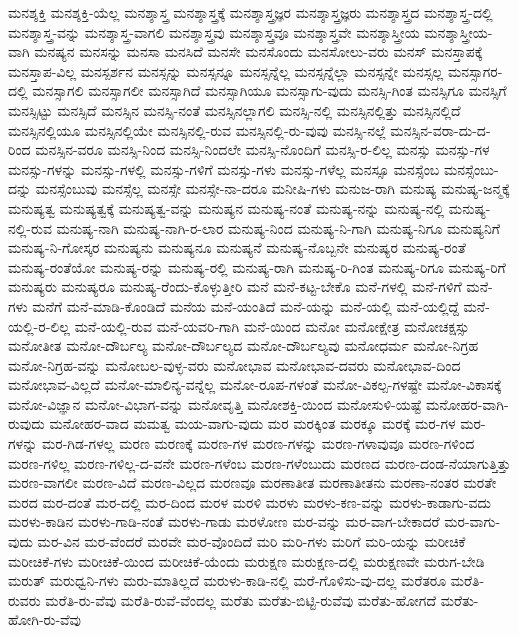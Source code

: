 {ಮನಶ್ಶಕ್ತಿ
ಮನಶ್ಶಕ್ತಿ-ಯೆಲ್ಲ
ಮನಶ್ಶಾಸ್ತ್ರ
ಮನಶ್ಶಾಸ್ತ್ರಕ್ಕೆ
ಮನಶ್ಶಾಸ್ತ್ರಜ್ಞರ
ಮನಶ್ಶಾಸ್ತ್ರಜ್ಞರು
ಮನಶ್ಶಾಸ್ತ್ರದ
ಮನಶ್ಶಾಸ್ತ್ರ-ದಲ್ಲಿ
ಮನಶ್ಶಾಸ್ತ್ರ-ವನ್ನು
ಮನಶ್ಶಾಸ್ತ್ರ-ವಾಗಲಿ
ಮನಶ್ಶಾಸ್ತ್ರವು
ಮನಶ್ಶಾಸ್ತ್ರವೂ
ಮನಶ್ಶಾಸ್ತ್ರವೇ
ಮನಶ್ಶಾಸ್ತ್ರೀಯ
ಮನಶ್ಶಾಸ್ತ್ರೀಯ-ವಾಗಿ
ಮನಷ್ಯನ
ಮನಸನ್ನು
ಮನಸಾ
ಮನಸಿದೆ
ಮನಸೇ
ಮನಸೊಂದು
ಮನಸೋಲು-ವರು
ಮನಸ್
ಮನಸ್ತಾಪಕ್ಕೆ
ಮನಸ್ತಾಪ-ವಿಲ್ಲ
ಮನಸ್ಪರ್ಶನ
ಮನಸ್ಸನ್ನು
ಮನಸ್ಸನ್ನೂ
ಮನಸ್ಸನ್ನೆಲ್ಲ
ಮನಸ್ಸನ್ನೆಲ್ಲಾ
ಮನಸ್ಸನ್ನೇ
ಮನಸ್ಸಲ್ಲ
ಮನಸ್ಸಾಗರ-ದಲ್ಲಿ
ಮನಸ್ಸಾಗಲಿ
ಮನಸ್ಸಾಗಲೀ
ಮನಸ್ಸಾಗಿದೆ
ಮನಸ್ಸಾಗಿಯೂ
ಮನಸ್ಸಾಗು-ವುದು
ಮನಸ್ಸಿ-ಗಿಂತ
ಮನಸ್ಸಿಗೂ
ಮನಸ್ಸಿಗೆ
ಮನಸ್ಸಿಟ್ಟು
ಮನಸ್ಸಿದೆ
ಮನಸ್ಸಿನ
ಮನಸ್ಸಿ-ನಂತೆ
ಮನಸ್ಸಿನಲ್ಲಾಗಲಿ
ಮನಸ್ಸಿ-ನಲ್ಲಿ
ಮನಸ್ಸಿನಲ್ಲಿತ್ತು
ಮನಸ್ಸಿನಲ್ಲಿದೆ
ಮನಸ್ಸಿನಲ್ಲಿಯೂ
ಮನಸ್ಸಿನಲ್ಲಿಯೇ
ಮನಸ್ಸಿನಲ್ಲಿ-ರುವ
ಮನಸ್ಸಿನಲ್ಲಿ-ರು-ವುವು
ಮನಸ್ಸಿ-ನಲ್ಲೆ
ಮನಸ್ಸಿನ-ವರಾ-ದು-ದ-ರಿಂದ
ಮನಸ್ಸಿನ-ವರೂ
ಮನಸ್ಸಿ-ನಿಂದ
ಮನಸ್ಸಿ-ನಿಂದಲೇ
ಮನಸ್ಸಿ-ನೊಂದಿಗೆ
ಮನಸ್ಸಿ-ರ-ಲಿಲ್ಲ
ಮನಸ್ಸು
ಮನಸ್ಸು-ಗಳ
ಮನಸ್ಸು-ಗಳನ್ನು
ಮನಸ್ಸು-ಗಳಲ್ಲಿ
ಮನಸ್ಸು-ಗಳಿಗೆ
ಮನಸ್ಸು-ಗಳು
ಮನಸ್ಸು-ಗಳೆಲ್ಲ
ಮನಸ್ಸೂ
ಮನಸ್ಸೆಂಬ
ಮನಸ್ಸೆಂಬು-ದನ್ನು
ಮನಸ್ಸೆಂಬುವು
ಮನಸ್ಸೆಲ್ಲ
ಮನಸ್ಸೇ
ಮನಸ್ಸೇ-ನಾ-ದರೂ
ಮನೀಷಿ-ಗಳು
ಮನುಜ-ರಾಗಿ
ಮನುಷ್ಯ
ಮನುಷ್ಯ-ಜನ್ಮಕ್ಕೆ
ಮನುಷ್ಯತ್ವ
ಮನುಷ್ಯತ್ವಕ್ಕೆ
ಮನುಷ್ಯತ್ವ-ವನ್ನು
ಮನುಷ್ಯನ
ಮನುಷ್ಯ-ನಂತೆ
ಮನುಷ್ಯ-ನನ್ನು
ಮನುಷ್ಯ-ನಲ್ಲಿ
ಮನುಷ್ಯ-ನಲ್ಲಿ-ರುವ
ಮನುಷ್ಯ-ನಾಗಿ
ಮನುಷ್ಯ-ನಾಗಿ-ರ-ಲಾರ
ಮನುಷ್ಯ-ನಿಂದ
ಮನುಷ್ಯ-ನಿ-ಗಾಗಿ
ಮನುಷ್ಯ-ನಿಗೂ
ಮನುಷ್ಯನಿಗೆ
ಮನುಷ್ಯ-ನಿ-ಗೋಸ್ಕರ
ಮನುಷ್ಯನು
ಮನುಷ್ಯನೂ
ಮನುಷ್ಯನೆ
ಮನುಷ್ಯ-ನೊಬ್ಬನೇ
ಮನುಷ್ಯರ
ಮನುಷ್ಯ-ರಂತೆ
ಮನುಷ್ಯ-ರಂತೆಯೋ
ಮನುಷ್ಯ-ರನ್ನು
ಮನುಷ್ಯ-ರಲ್ಲಿ
ಮನುಷ್ಯ-ರಾಗಿ
ಮನುಷ್ಯ-ರಿ-ಗಿಂತ
ಮನುಷ್ಯ-ರಿಗೂ
ಮನುಷ್ಯ-ರಿಗೆ
ಮನುಷ್ಯರು
ಮನುಷ್ಯರೂ
ಮನುಷ್ಯ-ರೆಂದು-ಕೊಳ್ಳುತ್ತೀರಿ
ಮನೆ
ಮನೆ-ಕಟ್ಟ-ಬೇಕೊ
ಮನೆ-ಗಳಲ್ಲಿ
ಮನೆ-ಗಳಿಗೆ
ಮನೆ-ಗಳು
ಮನೆಗೆ
ಮನೆ-ಮಾಡಿ-ಕೊಂಡಿದೆ
ಮನೆಯ
ಮನೆ-ಯಂತಿದೆ
ಮನೆ-ಯನ್ನು
ಮನೆ-ಯಲ್ಲಿ
ಮನೆ-ಯಲ್ಲಿದ್ದೆ
ಮನೆ-ಯಲ್ಲಿ-ರ-ಲಿಲ್ಲ
ಮನೆ-ಯಲ್ಲಿ-ರುವ
ಮನೆ-ಯವರಿ-ಗಾಗಿ
ಮನೆ-ಯಿಂದ
ಮನೋ
ಮನೋಕ್ಷೇತ್ರ
ಮನೋಚಕ್ಷಸ್ಸು
ಮನೋತೀತ
ಮನೋ-ದೌರ್ಬಲ್ಯ
ಮನೋ-ದೌರ್ಬಲ್ಯದ
ಮನೋ-ದೌರ್ಬಲ್ಯವು
ಮನೋಧರ್ಮ
ಮನೋ-ನಿಗ್ರಹ
ಮನೋ-ನಿಗ್ರಹ-ವನ್ನು
ಮನೋಬಲ-ವುಳ್ಳ-ವರು
ಮನೋಭಾವ
ಮನೋಭಾವ-ದವರು
ಮನೋಭಾವ-ದಿಂದ
ಮನೋಭಾವ-ವಿಲ್ಲದೆ
ಮನೋ-ಮಾಲಿನ್ಯ-ವನ್ನೆಲ್ಲ
ಮನೋ-ರೂಪ-ಗಳಂತೆ
ಮನೋ-ವಿಕಲ್ಪ-ಗಳಷ್ಟೇ
ಮನೋ-ವಿಕಾಸಕ್ಕೆ
ಮನೋ-ವಿಜ್ಞಾನ
ಮನೋ-ವಿಭಾಗ-ವನ್ನು
ಮನೋವೃತ್ತಿ
ಮನೋಶಕ್ತಿ-ಯಿಂದ
ಮನೋಸುಳಿ-ಯಷ್ಟೆ
ಮನೋಹರ-ವಾಗಿ-ರುವುದು
ಮನೋಹರ-ವಾದ
ಮಮತ್ವ
ಮಯ-ವಾಗು-ವುದು
ಮರ
ಮರಕ್ಕಿಂತ
ಮರಕ್ಕೂ
ಮರಕ್ಕೆ
ಮರ-ಗಳ
ಮರ-ಗಳನ್ನು
ಮರ-ಗಿಡ-ಗಳಲ್ಲ
ಮರಣ
ಮರಣಕ್ಕೆ
ಮರಣ-ಗಳ
ಮರಣ-ಗಳನ್ನು
ಮರಣ-ಗಳಾವುವೂ
ಮರಣ-ಗಳಿಂದ
ಮರಣ-ಗಳಿಲ್ಲ
ಮರಣ-ಗಳಿಲ್ಲ-ದ-ವನೇ
ಮರಣ-ಗಳೆಂಬ
ಮರಣ-ಗಳೆಂಬುದು
ಮರಣದ
ಮರಣ-ದಂಡ-ನೆಯಾಗುತ್ತಿತ್ತು
ಮರಣ-ವಾಗಲೀ
ಮರಣ-ವಿದೆ
ಮರಣ-ವಿಲ್ಲದ
ಮರಣವೂ
ಮರಣಾತೀತ
ಮರಣಾತೀತನು
ಮರಣಾ-ನಂತರ
ಮರತೇ
ಮರದ
ಮರ-ದಂತೆ
ಮರ-ದಲ್ಲಿ
ಮರ-ದಿಂದ
ಮರಳ
ಮರಳಿ
ಮರಳು
ಮರಳು-ಕಣ-ವನ್ನು
ಮರಳು-ಕಾಡಾಗು-ವದು
ಮರಳು-ಕಾಡಿನ
ಮರಳು-ಗಾಡಿ-ನಂತೆ
ಮರಳು-ಗಾಡು
ಮರಳೋಣ
ಮರ-ವನ್ನು
ಮರ-ವಾಗ-ಬೇಕಾದರೆ
ಮರ-ವಾಗು-ವುದು
ಮರ-ವಿನ
ಮರ-ವೆಂದರೆ
ಮರವೇ
ಮರ-ವೊಂದಿದೆ
ಮರಿ
ಮರಿ-ಗಳು
ಮರಿಗೆ
ಮರಿ-ಯನ್ನು
ಮರೀಚಿಕೆ
ಮರೀಚಿಕೆ-ಗಳು
ಮರೀಚಿಕೆ-ಯಿಂದ
ಮರೀಚಿಕೆ-ಯೆಂದು
ಮರುಕ್ಷಣ
ಮರುಕ್ಷಣ-ದಲ್ಲಿ
ಮರುಕ್ಷಣವೇ
ಮರುಗ-ಬೇಡಿ
ಮರುತ್
ಮರುಧ್ವನಿ-ಗಳು
ಮರು-ಮಾತಿಲ್ಲದೆ
ಮರುಳು-ಕಾಡಿ-ನಲ್ಲಿ
ಮರೆ-ಗೊಳಿಸು-ವು-ದಲ್ಲ
ಮರೆತರೂ
ಮರೆತಿ-ರುವರು
ಮರೆತಿ-ರು-ವೆವು
ಮರೆತಿ-ರುವೆ-ವೆಂದಲ್ಲ
ಮರೆತು
ಮರೆತು-ಬಿಟ್ಟಿ-ರುವೆವು
ಮರೆತು-ಹೋಗದೆ
ಮರೆತು-ಹೋಗಿ-ರು-ವೆವು
}
